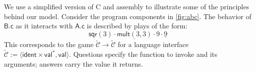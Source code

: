 \documentclass[sigplan,10pt,review]{acmart}
\newcommand{\kw}[1]{\ensuremath{ \mathsf{#1} }}
\begin{document}
\begin{example} \label{ex:abc} %
We use a simplified version of C and assembly
to illustrate some of the principles behind our model.
Consider the program components in \autoref{fig:abc}.
The behavior of $\textsf{B.c}$
as it interacts with $\textsf{A.c}$
is described by plays of the form:
\begin{equation} \label{eqn:cplay}
  \mathsf{sqr}(3) \cdot
    \underline{\mathsf{mult}(3,3)} \cdot 9 \cdot \underline{9}
\end{equation}
This corresponds to the game
$\tilde{\mathcal{C}} \rightarrow \tilde{\mathcal{C}}$
for a language interface
$\tilde{\mathcal{C}} :=
 \langle \kw{ident} \times \kw{val}^*, \kw{val} \rangle$.
Questions specify the function to invoke
and its arguments;
answers carry the value it returns.


\end{example}
\end{document}

